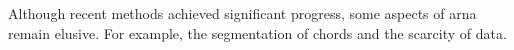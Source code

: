 

Although recent methods achieved significant progress, some
aspects of \gls{arna} remain elusive. For example, the
segmentation of chords and the scarcity of data.
